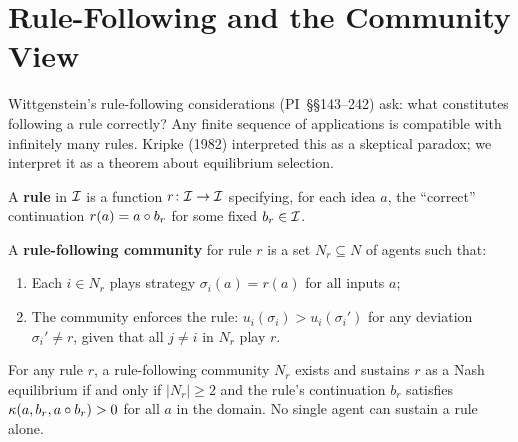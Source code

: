 \section{Rule-Following and the Community View}
\label{sec:rule-following}

Wittgenstein's rule-following considerations (PI~\S\S143--242)
ask: what constitutes following a rule correctly?  Any finite
sequence of applications is compatible with infinitely many
rules.  Kripke (1982) interpreted this as a skeptical paradox;
we interpret it as a theorem about equilibrium selection.

\begin{definition}[Rule]
\label{def:rule}
A \textbf{rule} in $\mathcal{I}$ is a function $r \colon \mathcal{I} \to \mathcal{I}$
specifying, for each idea $a$, the ``correct'' continuation
$r(a) = a \circ b_r$ for some fixed $b_r \in \mathcal{I}$.
\end{definition}

\begin{definition}
\label{def:rule-community}
A \textbf{rule-following community} for rule $r$ is a set $N_r
\subseteq N$ of agents such that:
\begin{enumerate}[label=(\roman*)]
  \item Each $i \in N_r$ plays strategy $\sigma_i(a) = r(a)$
    for all inputs $a$;
  \item The community enforces the rule: $u_i(\sigma_i) >
    u_i(\sigma_i')$ for any deviation $\sigma_i' \ne r$, given
    that all $j \ne i$ in $N_r$ play $r$.
\end{enumerate}
\end{definition}

\begin{theorem}
\label{thm:rule-following}
For any rule $r$, a rule-following community $N_r$ exists and
sustains $r$ as a Nash equilibrium if and only if $|N_r| \ge 2$
and the rule's continuation $b_r$ satisfies
$\kappa(a, b_r, a \circ b_r) > 0$ for all $a$ in the domain.
No single agent can sustain a rule alone.
\end{theorem}

